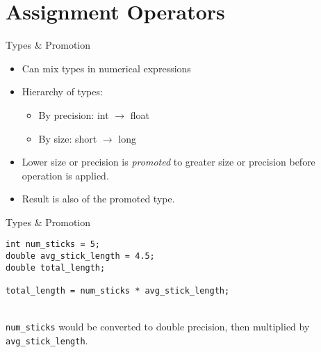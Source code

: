 \documentclass[graphics]{beamer}
\begin{document}
\section*{Assignment Operators}\label{sec:assignop}
\begin{frame}{Types \& Promotion}
    \begin{itemize}
        \item Can mix types in numerical expressions
        \item Hierarchy of types:
        \begin{itemize}
            \item By precision: int $\rightarrow$ float
            \item By size: short $\rightarrow$ long
        \end{itemize}
        \item Lower size or precision is \textit{promoted} to greater size or precision before operation is applied.
        \item Result is also of the promoted type.
    \end{itemize}
\end{frame}

\begin{frame}[fragile]{Types \& Promotion}
\begin{verbatim}
int num_sticks = 5;
double avg_stick_length = 4.5;
double total_length;

total_length = num_sticks * avg_stick_length;
\end{verbatim} ~~ \\
\texttt{num\_sticks} would be converted to double precision, then multiplied by \texttt{avg\_stick\_length}.
\end{frame}
\end{document}

